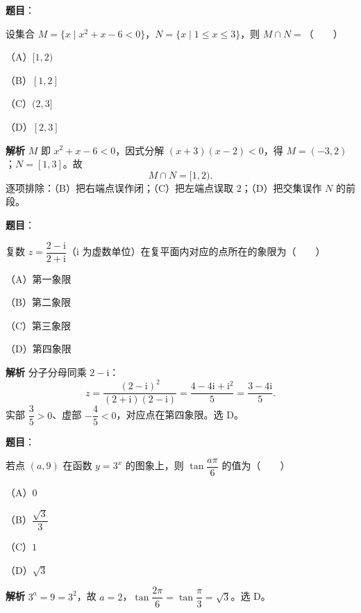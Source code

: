 
\begin{answer}

\textbf{题目}：

设集合 $M=\{x\mid x^2+x-6<0\}$，$N=\{x\mid 1\leqslant x\leqslant 3\}$，则 $M\cap N=$\mbox{（　　）}

（A）$[1,2)$

（B）$[1,2]$

（C）$(2,3]$

（D）$[2,3]$

\textbf{解析}
$M$ 即 $x^2+x-6<0$，因式分解 $(x+3)(x-2)<0$，得 $M=(-3,2)$；$N=[1,3]$。故
\nopagebreak[4]
\[M\cap N=[1,2).\]
逐项排除：（B）把右端点误作闭；（C）把左端点误取 $2$；（D）把交集误作 $N$ 的前段。


\end{answer}
\begin{answer}

\textbf{题目}：

复数 $z=\dfrac{2-\mathrm i}{2+\mathrm i}$（$\mathrm i$ 为虚数单位）在复平面内对应的点所在的象限为\mbox{（　　）}

（A）第一象限

（B）第二象限

（C）第三象限

（D）第四象限

\textbf{解析}
分子分母同乘 $2-\mathrm i$：
\nopagebreak[4]
\[z=\frac{(2-\mathrm i)^2}{(2+\mathrm i)(2-\mathrm i)}=\frac{4-4\mathrm i+\mathrm i^2}{5}=\frac{3-4\mathrm i}{5}.\]
实部 $\dfrac35>0$、虚部 $-\dfrac45<0$，对应点在第四象限。选 D。


\end{answer}
\begin{answer}

\textbf{题目}：

若点 $(a,9)$ 在函数 $y=3^x$ 的图象上，则 $\tan\dfrac{a\pi}{6}$ 的值为\mbox{（　　）}

（A）$0$

（B）$\dfrac{\sqrt3}{3}$

（C）$1$

（D）$\sqrt3$

\textbf{解析}
$3^a=9=3^2$，故 $a=2$，$\tan\dfrac{2\pi}{6}=\tan\dfrac\pi3=\sqrt3$。选 D。


\end{answer}
